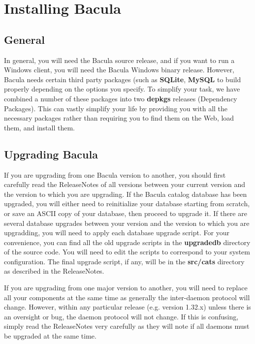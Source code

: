 
\section*{Installing Bacula}
\label{_ChapterStart17}

\subsection*{General}

In general, you will need the Bacula source release, and if you want to run a
Windows client, you will need the Bacula Windows binary release. However,
Bacula needs certain third party packages (such as {\bf SQLite}, {\bf MySQL}
to build properly depending on the options you specify. To simplify your task,
we have combined a number of these packages into two {\bf depkgs} releases
(Dependency Packages). This can vastly simplify your life by providing you
with all the necessary packages rather than requiring you to find them on the
Web, load them, and install them. 
\label{upgrading1}

\subsection*{Upgrading Bacula}

If you are upgrading from one Bacula version to another, you should first
carefully read the ReleaseNotes of all versions between your current version
and the version to which you are upgrading. If the Bacula catalog database has
been upgraded, you will either need to reinitialize your database starting
from scratch, or save an ASCII copy of your database, then proceed to upgrade
it. If there are several database upgrades between your version and the
version to which you are upgradding, you will need to apply each database
upgrade script. For your convenience, you can find all the old upgrade scripts
in the {\bf upgradedb} directory of the source code. You will need to edit the
scripts to correspond to your system configuration. The final upgrade script,
if any, will be in the {\bf src/cats} directory as described in the
ReleaseNotes. 

If you are upgrading from one major version to another, you will need to
replace all your components at the same time as generally the inter-daemon
protocol will change. However, within any particular release (e.g. version
1.32.x) unless there is an oversight or bug, the daemon protocol will not
change. If this is confusing, simply read the ReleaseNotes very carefully as
they will note if all daemons must be upgraded at the same time. 

